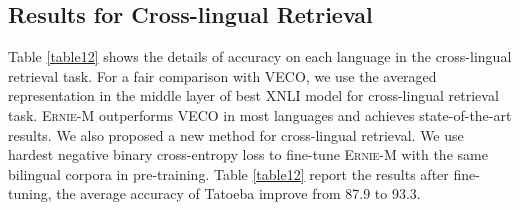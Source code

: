 \documentclass[11pt]{article}
\begin{document}
\subsection{Results for Cross-lingual Retrieval}

Table \ref{table12} shows the details of accuracy on each language in the cross-lingual retrieval task. For a fair comparison with VECO, we use the averaged representation in the middle layer of best XNLI model for cross-lingual retrieval task. \textsc{Ernie-M} outperforms VECO in most languages and achieves state-of-the-art results. We also proposed a new method for cross-lingual retrieval. We use hardest negative binary cross-entropy loss \cite{wang2019camp,faghri2017vse++} to fine-tune \textsc{Ernie-M} with the same bilingual corpora in pre-training. Table \ref{table12} report the results after fine-tuning, the average accuracy of Tatoeba improve from 87.9 to 93.3.
\end{document}
